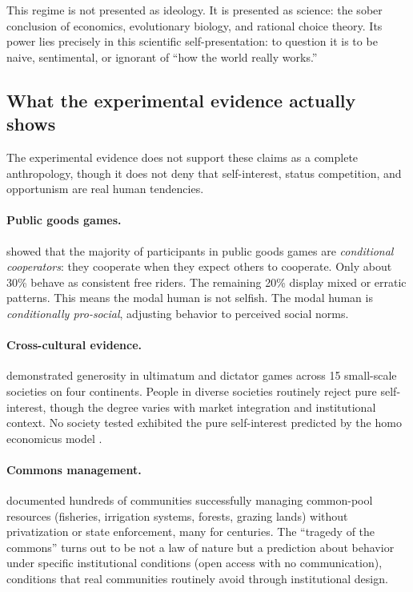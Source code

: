This regime is not presented as ideology. It is presented as science: the sober conclusion of economics, evolutionary biology, and rational choice theory.
Its power lies precisely in this scientific self-presentation: to question it is to be naive, sentimental, or ignorant of ``how the world really works.''

\subsection{What the experimental evidence actually shows}

The experimental evidence does not support these claims as a complete anthropology, though it does not deny that self-interest, status competition, and opportunism are real human tendencies.

\paragraph{Public goods games.}
\textcite{fischbacher2001} showed that the majority of participants in public goods games are \emph{conditional cooperators}: they cooperate when they expect others to cooperate.
Only about 30\% behave as consistent free riders.
The remaining 20\% display mixed or erratic patterns.
This means the modal human is not selfish. The modal human is \emph{conditionally pro-social}, adjusting behavior to perceived social norms.

\paragraph{Cross-cultural evidence.}
\textcite{henrich2001} demonstrated generosity in ultimatum and dictator games across 15 small-scale societies on four continents.
People in diverse societies routinely reject pure self-interest, though the degree varies with market integration and institutional context.
No society tested exhibited the pure self-interest predicted by the homo economicus model \autocite{henrich2020}.

\paragraph{Commons management.}
\textcite{ostrom1990} documented hundreds of communities successfully managing common-pool resources (fisheries, irrigation systems, forests, grazing lands) without privatization or state enforcement, many for centuries.
The ``tragedy of the commons'' \autocite{hardin1968} turns out to be not a law of nature but a prediction about behavior under specific institutional conditions (open access with no communication), conditions that real communities routinely avoid through institutional design.

